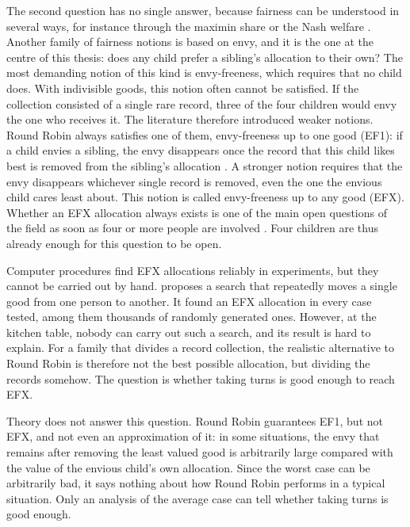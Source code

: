The second question has no single answer, because fairness can be understood in several ways, for
instance through the maximin share \parencite[p.~1064]{budish2011} or the Nash welfare
\parencite{caragiannis2019}. Another family of fairness notions is based on envy, and it is the
one at the centre of this thesis: does any child prefer a sibling's allocation to their own? The most demanding notion of this kind is envy-freeness, which requires that no child does. With indivisible goods, this notion often cannot be
satisfied. If the collection consisted of a single rare record, three of the four children would envy the
one who receives it. The literature therefore introduced weaker notions. Round Robin always satisfies one of
them, envy-freeness up to one good (EF1): if a child envies a sibling, the envy disappears once the
record that this child likes best is removed from the sibling's allocation
\parencite{caragiannis2019,amanatidis2023survey}. A stronger notion requires that the envy
disappears whichever single record is removed, even the one the envious child cares least about.
This notion is called envy-freeness up to any good (EFX). Whether an EFX allocation always exists
is one of the main open questions of the field as soon as four or more people are involved
\parencite[Open Problem~2]{amanatidis2023survey}. Four children are thus already enough for this
question to be open.

Computer procedures find EFX allocations reliably in experiments, but they cannot be carried out by
hand. \textcite{branzei2025} proposes a search that repeatedly moves a single good from one person to
another. It found an EFX allocation in every case tested, among them thousands of randomly
generated ones. However, at the kitchen table, nobody can carry out such a search, and its result is hard to
explain. For a family that divides a record collection, the realistic alternative to Round Robin is
therefore not the best possible allocation, but dividing the records somehow. The question is
whether taking turns is good enough to reach EFX.

Theory does not answer this question. Round Robin guarantees EF1, but not EFX, and not even an
approximation of it: in some situations, the envy that remains after removing the least valued good
is arbitrarily large compared with the value of the envious child's own allocation. Since the worst case can be arbitrarily bad, it says nothing about how
Round Robin performs in a typical situation. Only an analysis of the average case can tell whether
taking turns is good enough.

